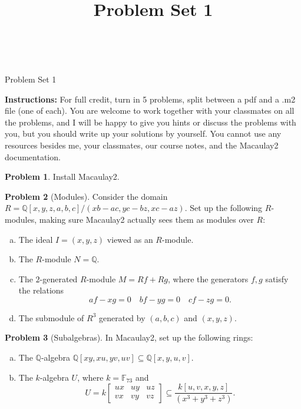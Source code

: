 \documentclass[11pt]{article}
\title{}
\date{\vspace{-0.5in}}
\title{Problem Set 1}
\theoremstyle{definition}
\newtheorem{problem}{Problem}
\begin{document}

\thispagestyle{fancy}
\pagestyle{fancy}

\


\begin{center}	
	{\LARGE Problem Set 1}
\end{center}

\vspace{3em}

\noindent
{\bf Instructions:}
For full credit, turn in 5 problems, split between a pdf and a .m2 file (one of each). 
You are welcome to work together with your classmates on all the problems, and I will be happy to give you hints or discuss the problems with you, but you should write up your solutions by yourself.
You cannot use any resources besides me, your classmates, our course notes, and the Macaulay2 documentation.

\vspace{2em}




\begin{problem} 
Install Macaulay2.%
\end{problem}


\begin{problem}[Modules]
	Consider the domain $R = \mathbb{Q}[x,y,z,a,b,c]/(xb-ac,yc-bz,xc-az)$. Set up the following $R$-modules, making sure Macaulay2 actually sees them as modules over $R$:
	\begin{enumerate}[a)]
		\item The ideal $I = (x,y,z)$ viewed as an $R$-module.
		\item The $R$-module $N = \mathbb{Q}$.
		\item The $2$-generated $R$-module $M = Rf + Rg$, where the generators $f, g$ satisfy the relations 
		$$af-xg = 0 \quad bf - yg = 0 \quad cf - zg = 0.$$
		\item The submodule of $R^3$ generated by $(a,b,c)$ and $(x,y,z)$.
	\end{enumerate}
\end{problem}


\begin{problem}[Subalgebras]
	In Macaulay2, set up the following rings:
	\begin{enumerate}[a)]
		\item The $\mathbb{Q}$-algebra $\mathbb{Q}[xy,xu,yv,uv] \subseteq \mathbb{Q}[x,y,u,v]$.
		\item The $k$-algebra $U$, where $k = \mathbb{F}_{73}$ and
		$$U = k \begin{bmatrix} ux & uy & uz \\ vx & vy & vz \end{bmatrix} \subseteq \frac{k[u,v,x,y,z]}{(x^3+y^3+z^3)}.$$
	\end{enumerate}
\end{problem}
\end{document}

